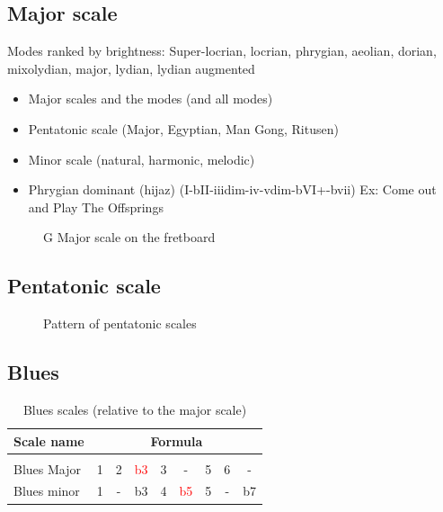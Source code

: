 \documentclass{article}
\begin{document}
\newpage
\subsection{Major scale}
Modes ranked by brightness: Super-locrian, locrian, phrygian, aeolian, dorian, mixolydian, major, lydian, lydian augmented

\begin{itemize}
	\item Major scales and the modes (and all modes)
	\item Pentatonic scale (Major, Egyptian, Man Gong, Ritusen)
	\item Minor scale (natural, harmonic, melodic)
	\item Phrygian dominant (hijaz) (I-bII-iiidim-iv-vdim-bVI+-bvii)  Ex: Come out and Play The Offsprings
\end{itemize}

\begin{figure}[h!]
	\centering
	\hspace*{-2cm}
	\scalebox{0.5}{}
	\caption{G Major scale on the fretboard}
	\label{fig:gamme_majeure_manche}
\end{figure}

\newpage
\subsection{Pentatonic scale}

\begin{figure}[h!]
	\centering
	\hspace*{-2cm}
	\scalebox{0.5}{}
	\caption{Pattern of pentatonic scales}
	\label{fig:gammme_penta_manche}
\end{figure}

\newpage
\subsection{Blues}


\begin{table}[!h]
	\caption{Blues scales (relative to the major scale)}
	\centering
	\begin{tabular}{l|cccccccc}
		Scale name  & \multicolumn{8}{c}{Formula} \\
		\hline \hline \vspace{-0.4cm} \\
		Blues Major   & 1 & 2  & \textcolor{red}{b3} & 3  &   -   & 5  & 6  &  -  \\
		Blues minor   & 1 &  - & b3 & 4  & \textcolor{red}{b5} &  5  & - &  b7 \\
	\end{tabular}
	\label{tab: }
\end{table}
\end{document}
